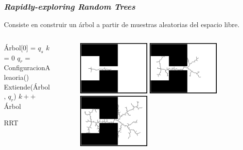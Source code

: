 \begin{frame}\frametitle{\textit{Rapidly-exploring Random Trees}}
  Consiste en construir un árbol a partir de muestras aleatorias del espacio libre.
  \begin{columns}
    \begin{column}{0.4\textwidth}
      \begin{algorithm}[H]\small
        Árbol[0] = $q_{s}$\;
        $k$ = 0\;
              {
                $q_{r}$ = ConfiguracionAleaoria()\;
                Extiende(Árbol, $q_{r}$)\;
                $k++$\;
              }
              \Return Árbol\;
              \caption{RRT}
      \end{algorithm}
    \end{column}
    \begin{column}{0.6\textwidth}
      \begin{figure}
        \centering
        \includegraphics[width=0.45\textwidth]{Figures/RRTO010.png}
        \includegraphics[width=0.45\textwidth]{Figures/RRTO0100.png}
        \includegraphics[width=0.45\textwidth]{Figures/RRTO0300.png}
      \end{figure}
    \end{column}
  \end{columns}
\end{frame}

